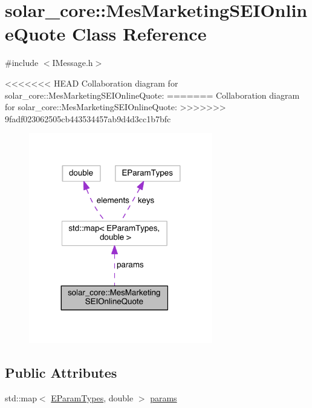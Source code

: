 \hypertarget{classsolar__core_1_1_mes_marketing_s_e_i_online_quote}{}\section{solar\+\_\+core\+:\+:Mes\+Marketing\+S\+E\+I\+Online\+Quote Class Reference}
\label{classsolar__core_1_1_mes_marketing_s_e_i_online_quote}


{\ttfamily \#include $<$I\+Message.\+h$>$}



<<<<<<< HEAD
Collaboration diagram for solar\+\_\+core\+:\+:Mes\+Marketing\+S\+E\+I\+Online\+Quote\+:\nopagebreak
=======
Collaboration diagram for solar\+\_\+core\+:\+:Mes\+Marketing\+S\+E\+I\+Online\+Quote\+:
\nopagebreak
>>>>>>> 9fadf023062505cb443534457ab9d4d3cc1b7bfc
\begin{figure}[H]
\begin{center}
\leavevmode
\includegraphics[width=227pt]{classsolar__core_1_1_mes_marketing_s_e_i_online_quote__coll__graph}
\end{center}
\end{figure}
\subsection*{Public Attributes}
\begin{DoxyCompactItemize}
\item 
std\+::map$<$ \hyperlink{namespacesolar__core_aa1147341e5ef7a40d68d1bd68e149362}{E\+Param\+Types}, double $>$ \hyperlink{classsolar__core_1_1_mes_marketing_s_e_i_online_quote_a985cbf3eb866c4488f0de003c4090aaf}{params}
\end{DoxyCompactItemize}


